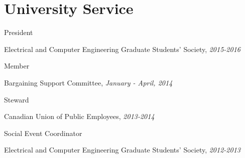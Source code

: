\section{\sc University Service}

President
\begin{list1}
\item[] Electrical and Computer Engineering Graduate Students' Society, \textit{2015-2016}
\end{list1}


Member
\begin{list1}
\item[] Bargaining Support Committee, \textit{January - April, 2014}
\end{list1}

Steward
\begin{list1}
\item[] Canadian Union of Public Employees, \textit{2013-2014}
\end{list1}

Social Event Coordinator
\begin{list1}
\item[] Electrical and Computer Engineering Graduate Students' Society, \textit{2012-2013}
\end{list1}
